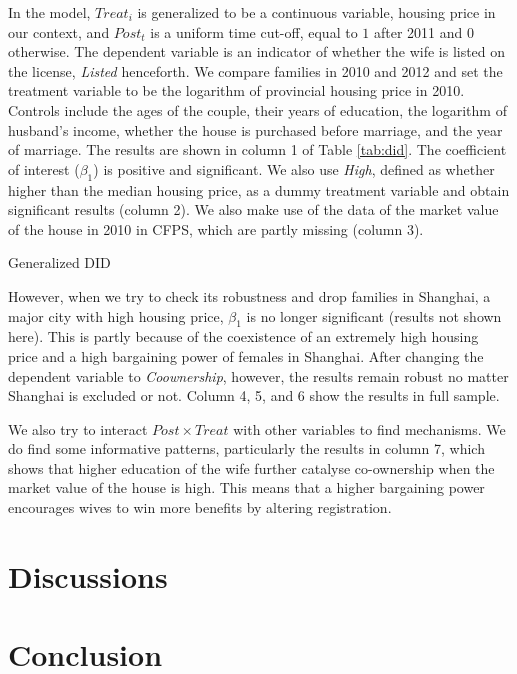 \documentclass[11pt]{article}
\begin{document}
In the model, $Treat_{i}$ is generalized to be a continuous variable, housing price in our context, and $Post_t$ is a uniform time cut-off, equal to $1$ after 2011 and $0$ otherwise. The dependent variable is an indicator of whether the wife is listed on the license, \textit{Listed} henceforth. We compare families in 2010 and 2012 and set the treatment variable to be the logarithm of provincial housing price in 2010. Controls include the ages of the couple, their years of education, the logarithm of husband's income, whether the house is purchased before marriage, and the year of marriage. The results are shown in column 1 of Table \ref{tab:did}. The coefficient of interest ($\beta_1$) is positive and significant. We also use \textit{High}, defined as whether higher than the median housing price, as a dummy treatment variable and obtain significant results (column 2). We also make use of the data of the market value of the house in 2010 in CFPS, which are partly missing (column 3).  

\begin{table}
    \centering
    \resizebox{\textwidth}{!}{
    }
    \caption{Generalized DID}
    \label{tab:did}
\end{table}

However, when we try to check its robustness and drop families in Shanghai, a major city with high housing price, $\beta_1$ is no longer significant (results not shown here). This is partly because of the coexistence of an extremely high housing price and a high bargaining power of females in Shanghai. After changing the dependent variable to \textit{Coownership}, however, the results remain robust no matter Shanghai is excluded or not. Column 4, 5, and 6 show the results in full sample.

We also try to interact $Post\times Treat$ with other variables to find mechanisms. We do find some informative patterns, particularly the results in column 7, which shows that higher education of the wife further catalyse co-ownership when the market value of the house is high. This means that a higher bargaining power encourages wives to win more benefits by altering registration.

\section{Discussions} \label{sec:discussion}

\section{Conclusion} \label{sec:conclusion}



\singlespacing
\setlength\bibsep{0pt}






\end{document}
